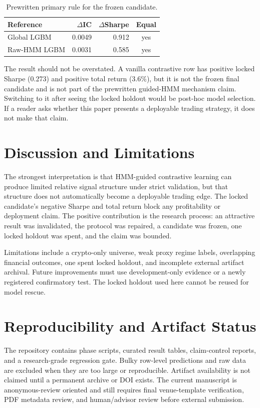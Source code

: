 \documentclass[sigconf,anonymous,review]{acmart}
\begin{document}
\begin{table}[t]
\caption{Prewritten primary rule for the frozen candidate.}
\label{tab:primary-rule}
\small
\begin{tabular}{lrrc}
\toprule
Reference & $\Delta$IC & $\Delta$Sharpe & Equal \\
\midrule
Global LGBM & 0.0049 & 0.912 & yes \\
Raw-HMM LGBM & 0.0031 & 0.585 & yes \\
\bottomrule
\end{tabular}
\end{table}

The result should not be overstated. A vanilla contrastive row has positive locked Sharpe (0.273) and positive total return (3.6\%), but it is not the frozen final candidate and is not part of the prewritten guided-HMM mechanism claim. Switching to it after seeing the locked holdout would be post-hoc model selection. If a reader asks whether this paper presents a deployable trading strategy, it does not make that claim.

\section{Discussion and Limitations}
The strongest interpretation is that HMM-guided contrastive learning can produce limited relative signal structure under strict validation, but that structure does not automatically become a deployable trading edge. The locked candidate's negative Sharpe and total return block any profitability or deployment claim. The positive contribution is the research process: an attractive result was invalidated, the protocol was repaired, a candidate was frozen, one locked holdout was spent, and the claim was bounded.

Limitations include a crypto-only universe, weak proxy regime labels, overlapping financial outcomes, one spent locked holdout, and incomplete external artifact archival. Future improvements must use development-only evidence or a newly registered confirmatory test. The locked holdout used here cannot be reused for model rescue.

\section{Reproducibility and Artifact Status}
The repository contains phase scripts, curated result tables, claim-control reports, and a research-grade regression gate. Bulky row-level predictions and raw data are excluded when they are too large or reproducible. Artifact availability is not claimed until a permanent archive or DOI exists. The current manuscript is anonymous-review oriented and still requires final venue-template verification, PDF metadata review, and human/advisor review before external submission.
\end{document}
